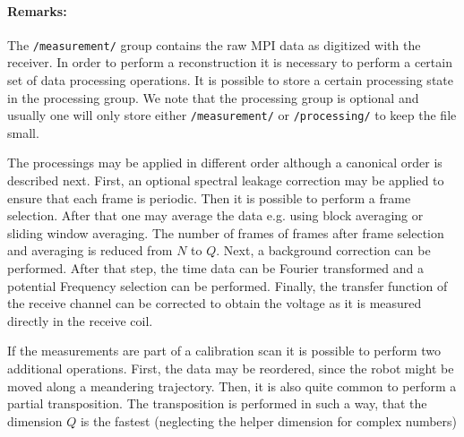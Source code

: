 \documentclass[landscape,a4paper]{article} %
\newcommand{\inl}[1]{\lstinline[columns=fixed]{#1}}
\begin{document}
\begin{multicols}{2}

\paragraph{Remarks:}
The \inl{/measurement/} group contains the raw MPI data as digitized with the receiver. In order to perform a reconstruction it is necessary to perform a certain set of data processing operations. It is possible to store a certain processing state in the processing group. We note that the processing group is optional and usually one will only store either \inl{/measurement/} or \inl{/processing/} to keep the file small.

The processings may be applied in different order although a canonical order is described next. First, an optional spectral leakage correction may be applied to ensure that each frame is periodic. Then it is possible to perform a frame selection. After that one may average the data e.g. using block averaging or sliding window averaging. The number of frames of frames after frame selection and averaging is reduced from $N$ to $Q$. Next, a background correction can be performed. After that step, the time data can be Fourier transformed and a potential Frequency selection can be performed. Finally, the transfer function of the receive channel can be corrected to obtain the voltage as it is measured directly in the receive coil.

If the measurements are part of a calibration scan it is possible to perform two additional operations. First, the data may be reordered, since the robot might be moved along a meandering trajectory. Then, it is also quite common to perform a partial transposition. The transposition is performed in such a way, that the dimension $Q$ is the fastest (neglecting the helper dimension for complex numbers)
\end{multicols}
\end{document}
